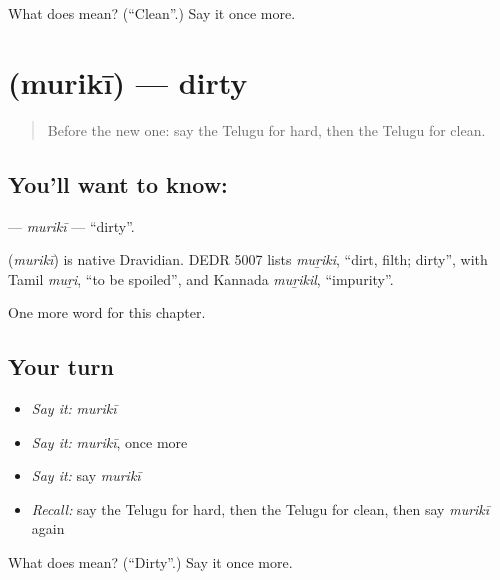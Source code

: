 \begin{tcolorbox}[breakable,colback=teal!4,colframe=teal!35!black,title={Before you move on}]
What does  mean? (\textquotedblleft{}Clean\textquotedblright{}.) Say it once more.
\end{tcolorbox}
\section[\texorpdfstring{\te{మురికి} (murikī)}{మురికి (murikī)}]{ (murikī) — dirty}

\label{lesson:TE-C137-muriki}



\begin{quote}
Before the new one: say the Telugu for hard, then the Telugu for clean.
\end{quote}

\subsection*{You'll want to know: }
\textbf{} — \emph{murikī} — \textquotedblleft{}dirty\textquotedblright{}.

\begin{cousinweb}
\textbf{} (\emph{murikī}) is native Dravidian. DEDR 5007 lists \emph{muṟiki}, \textquotedblleft{}dirt, filth; dirty\textquotedblright{}, with Tamil \emph{muṟi}, \textquotedblleft{}to be spoiled\textquotedblright{}, and Kannada \emph{muṟikil}, \textquotedblleft{}impurity\textquotedblright{}.
\end{cousinweb}

\begin{grammarlens}[title={What you've built}]
One more word for this chapter.
\end{grammarlens}

\subsection*{Your turn}
\begin{itemize}
\raggedright
  \item \emph{Say it:} \emph{murikī}
  \item \emph{Say it:} \emph{murikī}, once more
  \item \emph{Say it:} say \emph{murikī}
  \item \emph{Recall:} say the Telugu for hard, then the Telugu for clean, then say \emph{murikī} again
\end{itemize}

\begin{tcolorbox}[breakable,colback=teal!4,colframe=teal!35!black,title={Before you move on}]
What does  mean? (\textquotedblleft{}Dirty\textquotedblright{}.) Say it once more.
\end{tcolorbox}
